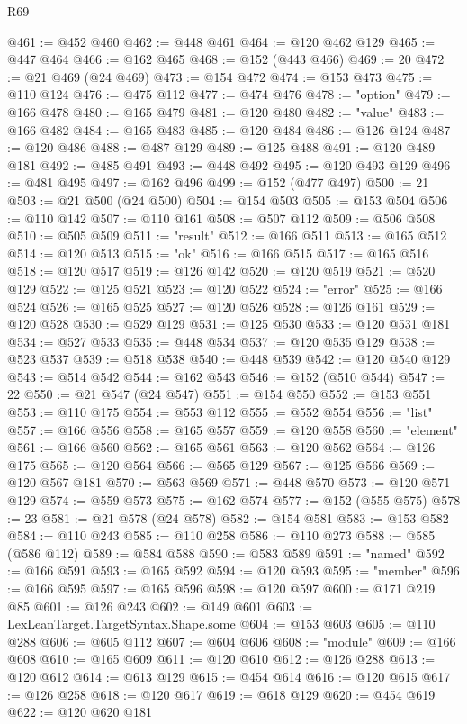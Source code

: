 \begin{lexlean}{R69}
\begin{coremodule}
@461 := @452 @460
@462 := @448 @461
@464 := @120 @462 @129
@465 := @447 @464
@466 := @162 @465
@468 := @152 (@443 @466)
@469 := 20
@472 := @21 @469 (@24 @469)
@473 := @154 @472
@474 := @153 @473
@475 := @110 @124
@476 := @475 @112
@477 := @474 @476
@478 := "option"
@479 := @166 @478
@480 := @165 @479
@481 := @120 @480
@482 := "value"
@483 := @166 @482
@484 := @165 @483
@485 := @120 @484
@486 := @126 @124
@487 := @120 @486
@488 := @487 @129
@489 := @125 @488
@491 := @120 @489 @181
@492 := @485 @491
@493 := @448 @492
@495 := @120 @493 @129
@496 := @481 @495
@497 := @162 @496
@499 := @152 (@477 @497)
@500 := 21
@503 := @21 @500 (@24 @500)
@504 := @154 @503
@505 := @153 @504
@506 := @110 @142
@507 := @110 @161
@508 := @507 @112
@509 := @506 @508
@510 := @505 @509
@511 := "result"
@512 := @166 @511
@513 := @165 @512
@514 := @120 @513
@515 := "ok"
@516 := @166 @515
@517 := @165 @516
@518 := @120 @517
@519 := @126 @142
@520 := @120 @519
@521 := @520 @129
@522 := @125 @521
@523 := @120 @522
@524 := "error"
@525 := @166 @524
@526 := @165 @525
@527 := @120 @526
@528 := @126 @161
@529 := @120 @528
@530 := @529 @129
@531 := @125 @530
@533 := @120 @531 @181
@534 := @527 @533
@535 := @448 @534
@537 := @120 @535 @129
@538 := @523 @537
@539 := @518 @538
@540 := @448 @539
@542 := @120 @540 @129
@543 := @514 @542
@544 := @162 @543
@546 := @152 (@510 @544)
@547 := 22
@550 := @21 @547 (@24 @547)
@551 := @154 @550
@552 := @153 @551
@553 := @110 @175
@554 := @553 @112
@555 := @552 @554
@556 := "list"
@557 := @166 @556
@558 := @165 @557
@559 := @120 @558
@560 := "element"
@561 := @166 @560
@562 := @165 @561
@563 := @120 @562
@564 := @126 @175
@565 := @120 @564
@566 := @565 @129
@567 := @125 @566
@569 := @120 @567 @181
@570 := @563 @569
@571 := @448 @570
@573 := @120 @571 @129
@574 := @559 @573
@575 := @162 @574
@577 := @152 (@555 @575)
@578 := 23
@581 := @21 @578 (@24 @578)
@582 := @154 @581
@583 := @153 @582
@584 := @110 @243
@585 := @110 @258
@586 := @110 @273
@588 := @585 (@586 @112)
@589 := @584 @588
@590 := @583 @589
@591 := "named"
@592 := @166 @591
@593 := @165 @592
@594 := @120 @593
@595 := "member"
@596 := @166 @595
@597 := @165 @596
@598 := @120 @597
@600 := @171 @219 @85
@601 := @126 @243
@602 := @149 @601
@603 := LexLeanTarget.TargetSyntax.Shape.some
@604 := @153 @603
@605 := @110 @288
@606 := @605 @112
@607 := @604 @606
@608 := "module"
@609 := @166 @608
@610 := @165 @609
@611 := @120 @610
@612 := @126 @288
@613 := @120 @612
@614 := @613 @129
@615 := @454 @614
@616 := @120 @615
@617 := @126 @258
@618 := @120 @617
@619 := @618 @129
@620 := @454 @619
@622 := @120 @620 @181

\end{coremodule}
\end{lexlean}
